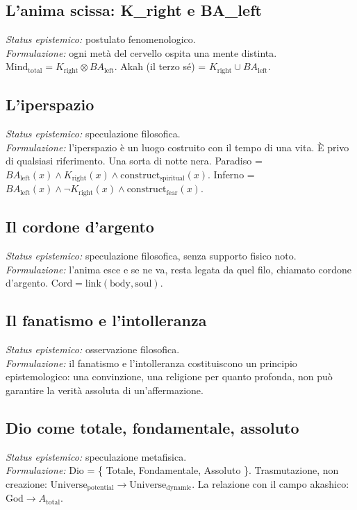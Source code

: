 \documentclass[11pt,a4paper]{article}
\begin{document}
\subsection{L'anima scissa: K\_right e BA\_left}
\textit{Status epistemico:} postulato fenomenologico. \\
\textit{Formulazione:} ogni metà del cervello ospita una mente distinta. $\text{Mind}_{\text{total}} = K_{\text{right}} \otimes BA_{\text{left}}$. Akah (il terzo sé) = $K_{\text{right}} \cup BA_{\text{left}}$.

\subsection{L'iperspazio}
\textit{Status epistemico:} speculazione filosofica. \\
\textit{Formulazione:} l'iperspazio è un luogo costruito con il tempo di una vita. È privo di qualsiasi riferimento. Una sorta di notte nera. Paradiso = $BA_{\text{left}}(x) \land K_{\text{right}}(x) \land \text{construct}_{\text{spiritual}}(x)$. Inferno = $BA_{\text{left}}(x) \land \neg K_{\text{right}}(x) \land \text{construct}_{\text{fear}}(x)$.

\subsection{Il cordone d'argento}
\textit{Status epistemico:} speculazione filosofica, senza supporto fisico noto. \\
\textit{Formulazione:} l'anima esce e se ne va, resta legata da quel filo, chiamato cordone d'argento. $\text{Cord} = \text{link}(\text{body}, \text{soul})$.

\subsection{Il fanatismo e l'intolleranza}
\textit{Status epistemico:} osservazione filosofica. \\
\textit{Formulazione:} il fanatismo e l'intolleranza costituiscono un principio epistemologico: una convinzione, una religione per quanto profonda, non può garantire la verità assoluta di un'affermazione.

\subsection{Dio come totale, fondamentale, assoluto}
\textit{Status epistemico:} speculazione metafisica. \\
\textit{Formulazione:} Dio = \{ Totale, Fondamentale, Assoluto \}. Trasmutazione, non creazione: $\text{Universe}_{\text{potential}} \to \text{Universe}_{\text{dynamic}}$. La relazione con il campo akashico: $\text{God} \to A_{\text{total}}$.
\end{document}
